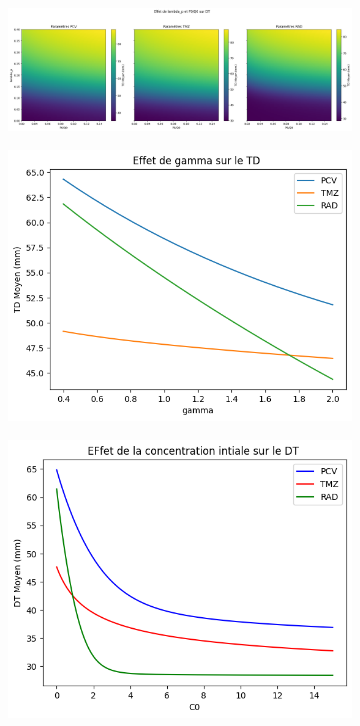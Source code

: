 \documentclass[12pt]{article}
\begin{document}
\begin{figure}
    
    \begin{subfigure}[t]{\textwidth}
    \centering
        \includegraphics[width=\linewidth]{Image/heatmap_lambdap_p0Q0.png} 
        \caption{} \label{fig:heatmap}
    \end{subfigure}
    \vspace{1cm}
    \centering
    \begin{subfigure}[t]{0.45\textwidth}
        \centering
        \includegraphics[width=\linewidth]{Image/effet_gamma.png} 
        \caption{} \label{fig:effet_gamma}
    \end{subfigure}
    \hfill
    \begin{subfigure}[t]{0.45\textwidth}
        \centering
        \includegraphics[width=\linewidth]{Image/effet_C.png} 

\end{subfigure}
\end{figure}
\end{document}
